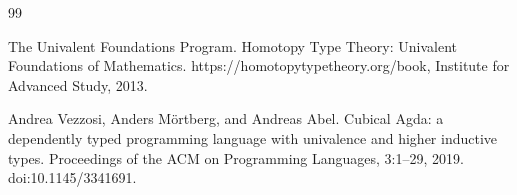 \documentclass[10pt,a4paper]{amsart}
\begin{document}
\begin{thebibliography}{99}
\par\noindent  [19]  The Univalent Foundations Program.  Homotopy Type Theory: Univalent Foundations of Mathematics.  https://homotopytypetheory.org/book, Institute for Advanced Study, 2013.  
 
\par\noindent  [20]  Andrea Vezzosi, Anders Mörtberg, and Andreas Abel.  Cubical Agda: a dependently typed programming language with univalence and higher inductive types.  Proceedings of the ACM on Programming Languages, 3:1–29, 2019.  doi:10.1145/3341691.  
  
\end{thebibliography}
\end{document}

